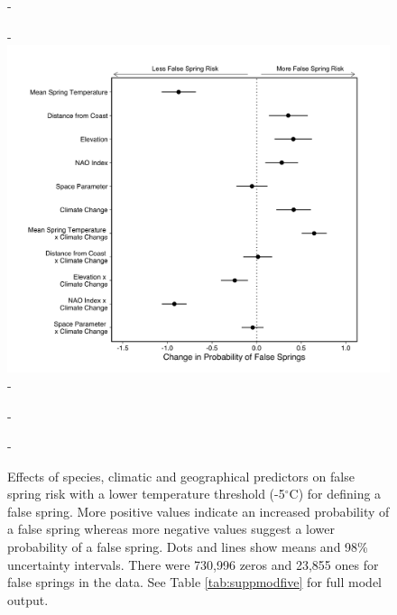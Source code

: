 \documentclass{article}\usepackage[]{graphicx}\usepackage[]{color}
\begin{document}
{\begin{figure} [H]
  -\begin{center}
  -\includegraphics[width=12cm]{..//analyses/figures/model_output_98_five.png}
  -\caption{Effects of species, climatic and geographical predictors on false spring risk with a lower temperature threshold (-5$^{\circ}$C) for defining a false spring. More positive values indicate an increased probability of a false spring whereas more negative values suggest a lower probability of a false spring. Dots and lines show means and 98\% uncertainty intervals. There were 730,996 zeros and 23,855 ones for false springs in the data. See Table \ref{tab:suppmodfive} for full model output. }\label{fig:five}
  -\end{center}
  -\end{figure}}
 
\end{document}
